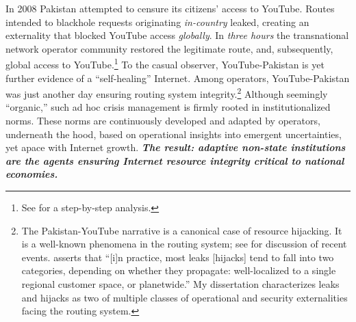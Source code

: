 \documentclass[12pt,journal,compsoc,letterpaper,onecolumn,twoside]{IEEEtran}
\begin{document}
In 2008 Pakistan attempted to censure its citizens' access to YouTube.  
%
Routes intended to blackhole requests originating 
\emph{in-country} leaked,
creating an externality that blocked YouTube access \emph{globally}. 
%
In \emph{three hours} the transnational network operator community restored
the legitimate route, and, subsequently, global access to YouTube.\footnote{See  for a step-by-step
  analysis.}  
%
To the casual observer, YouTube-Pakistan is yet
further evidence of a ``self-healing'' Internet. 
%
Among operators,
YouTube-Pakistan was just another day ensuring routing system
integrity.\footnote{The
  Pakistan-YouTube narrative is a canonical case of resource
  hijacking.  It is a well-known phenomena in the routing system; see
  \cite{toonk2014turkey, carstensen2014googles} for discussion of 
  recent events.   asserts that ``[i]n
  practice, most leaks [hijacks] tend  to fall into two categories,
  depending on whether they propagate: well-localized to a single
  regional customer space, or planetwide.'' 
  My dissertation characterizes leaks and hijacks as two of multiple
  classes of operational and security externalities facing the routing
  system.}
%
Although seemingly ``organic,'' such ad hoc crisis management is firmly
rooted in institutionalized norms.
%
These norms are continuously developed and
adapted by 
operators, underneath the hood, based on operational insights into
emergent uncertainties, yet apace with Internet growth. 
%
\textbf{\emph{The result: adaptive non-state institutions are \textbf{the}
  agents ensuring Internet resource integrity critical to national economies.}}
\end{document}
